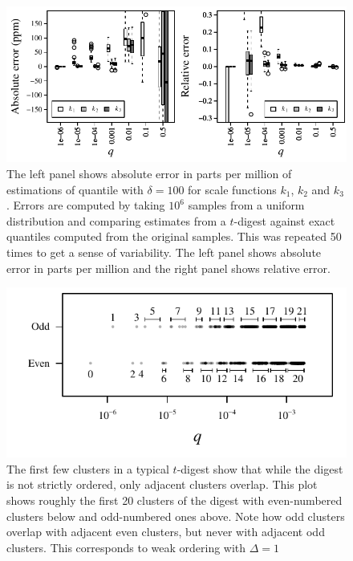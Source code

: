 \documentclass[]{statsoc}
\begin{document}
\begin{figure}[p] %
   \includegraphics[width=5.5in]{figures/relative-error.pdf} 
   \caption{The left panel shows absolute error in parts per million of estimations of quantile with $\delta = 100$ for scale functions $k_1$, $k_2$ and $k_3$. Errors are computed by taking $10^6$ samples from a uniform distribution and comparing estimates from a $t$-digest against exact quantiles computed from the original samples. This was repeated 50 times to get a sense of variability. The left panel shows absolute error in parts per million and the right panel shows relative error.}
   \label{fig:by-scale}
\end{figure}

\begin{figure}[p] %
   \includegraphics[width=4.5in]{figures/cluster-spread.pdf} 
   \caption{The first few clusters in a typical $t$-digest show that while the digest is not strictly ordered, only adjacent clusters overlap. This plot shows roughly the first 20 clusters of the digest with even-numbered clusters below and odd-numbered ones above. Note how odd clusters overlap with adjacent even clusters, but never with adjacent odd clusters. This corresponds to weak ordering with $\Delta=1$  }
   \label{fig:cluster-spread}
\end{figure}
\end{document}
